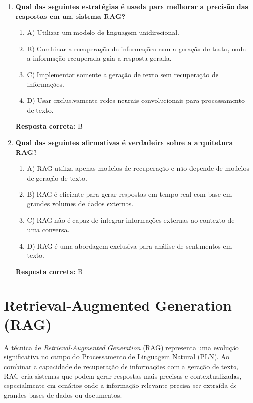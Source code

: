 \documentclass[14pt,a4paper,oneside]{book}
\begin{document}
\begin{enumerate}
	\item \textbf{Qual das seguintes estratégias é usada para melhorar a precisão das respostas em um sistema RAG?}
	\begin{enumerate}[label=\alph*)]
		\item A) Utilizar um modelo de linguagem unidirecional.
		\item B) Combinar a recuperação de informações com a geração de texto, onde a informação recuperada guia a resposta gerada.
		\item C) Implementar somente a geração de texto sem recuperação de informações.
		\item D) Usar exclusivamente redes neurais convolucionais para processamento de texto.
	\end{enumerate}
	\vspace{5mm}
	\textbf{Resposta correta:} B
	
	\item \textbf{Qual das seguintes afirmativas é verdadeira sobre a arquitetura RAG?}
	\begin{enumerate}[label=\alph*)]
		\item A) RAG utiliza apenas modelos de recuperação e não depende de modelos de geração de texto.
		\item B) RAG é eficiente para gerar respostas em tempo real com base em grandes volumes de dados externos.
		\item C) RAG não é capaz de integrar informações externas ao contexto de uma conversa.
		\item D) RAG é uma abordagem exclusiva para análise de sentimentos em texto.
	\end{enumerate}
	\vspace{5mm}
	\textbf{Resposta correta:} B
	
\end{enumerate}


\chapter{Retrieval-Augmented Generation (RAG)}

A técnica de \textit{Retrieval-Augmented Generation} (RAG) representa uma evolução significativa no campo do Processamento de Linguagem Natural (PLN). Ao combinar a capacidade de recuperação de informações com a geração de texto, RAG cria sistemas que podem gerar respostas mais precisas e contextualizadas, especialmente em cenários onde a informação relevante precisa ser extraída de grandes bases de dados ou documentos.
\end{document}
